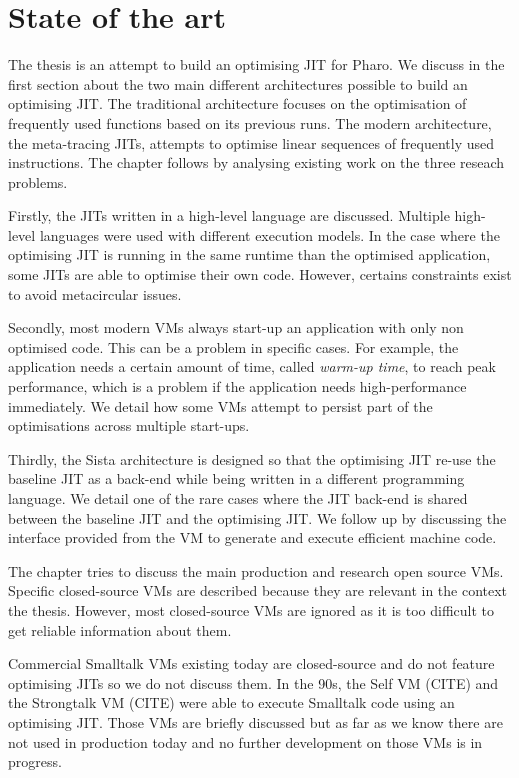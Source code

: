 \documentclass[a4paper,12pt,twoside]{../includes/ThesisStyle}
\begin{document}
\fi

\chapter{State of the art}
\label{chap:stateOfTheArt}
\minitoc

The thesis is an attempt to build an optimising JIT for Pharo. We discuss in the first section about the two main different architectures possible to build an optimising JIT. The traditional architecture focuses on the optimisation of frequently used functions based on its previous runs. The modern architecture, the meta-tracing JITs, attempts to optimise linear sequences of frequently used instructions. The chapter follows by analysing existing work on the three reseach problems.

Firstly, the JITs written in a high-level language are discussed. Multiple high-level languages were used with different execution models. In the case where the optimising JIT is running in the same runtime than the optimised application, some JITs are able to optimise their own code. However, certains constraints exist to avoid metacircular issues.

Secondly, most modern VMs always start-up an application with only non optimised code. This can be a problem in specific cases. For example, the application needs a certain amount of time, called \emph{warm-up time}, to reach peak performance, which is a problem if the application needs high-performance immediately. We detail how some VMs attempt to persist part of the optimisations across multiple start-ups.

Thirdly, the Sista architecture is designed so that the optimising JIT re-use the baseline JIT as a back-end while being written in a different programming language. We detail one of the rare cases where the JIT back-end is shared between the baseline JIT and the optimising JIT. We follow up by discussing the interface provided from the VM to generate and execute efficient machine code.

The chapter tries to discuss the main production and research open source VMs. Specific closed-source VMs are described because they are relevant in the context the thesis. However, most closed-source VMs are ignored as it is too difficult to get reliable information about them. 

Commercial Smalltalk VMs existing today are closed-source and do not feature optimising JITs so we do not discuss them. In the 90s, the Self VM (CITE) and the Strongtalk VM (CITE) were able to execute Smalltalk code using an optimising JIT. Those VMs are briefly discussed but as far as we know there are not used in production today and no further development on those VMs is in progress.
\end{document}
